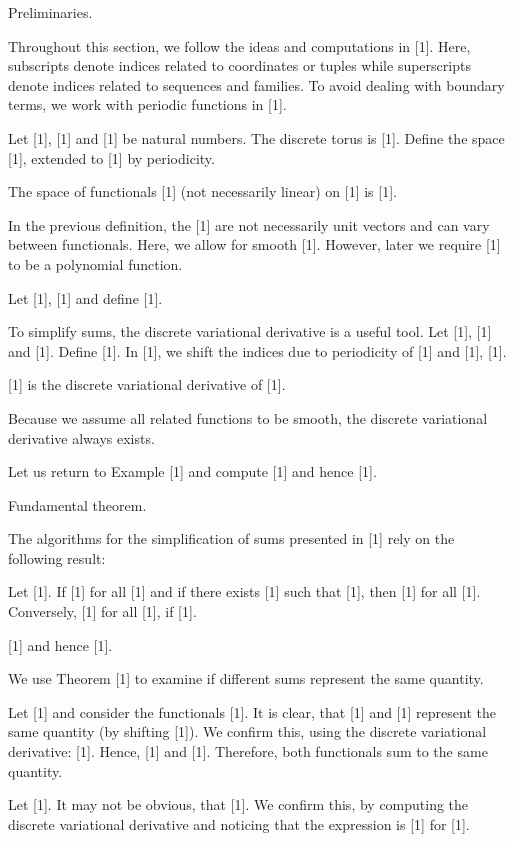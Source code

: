\documentclass{article}
\begin{document}
Preliminaries.



Throughout this section, we follow the ideas and computations in [1].
Here, subscripts denote indices related to coordinates or tuples while superscripts denote indices related to sequences and families.
To avoid dealing with boundary terms, we work with periodic functions in [1].

	Let [1], [1] and [1] be natural numbers. The {discrete torus} is [1]. Define the space
	[1],
	extended to [1] by periodicity.


	The space of functionals [1] (not necessarily linear) on [1] is
[1].

In the previous definition, the [1] are not necessarily unit vectors and can vary between functionals. Here, we allow for smooth [1]. However, later we require [1] to be a polynomial function.

	
	Let [1], [1] and define
	[1].

To simplify sums, the discrete variational derivative is a useful tool.
Let [1], [1] and [1]. Define
	[1].
	In [1], we shift the indices due to periodicity of [1] and [1],
	[1].

[1] is the discrete variational derivative of [1].

Because we assume all related functions to be smooth, the discrete variational derivative always exists.

	Let us return to Example [1] and compute
	[1]
	and hence [1].


Fundamental theorem.


The algorithms for the simplification of sums presented in [1] rely on the following result:

	Let [1]. If [1] for all [1] and if there exists [1] such that [1], then
	[1]
	for all [1].
	Conversely,
	[1]
	for all [1], if [1].


	[1]
	and hence [1].

We use Theorem [1] to examine if different sums represent the same quantity.

	Let [1] and consider the functionals
	[1].
	It is clear, that [1] and [1] represent the same quantity (by shifting [1]). We confirm this, using the discrete variational derivative:
	[1].
	Hence, [1] and [1]. Therefore, both functionals sum to the same quantity.



	Let [1]. It may not be obvious, that
	[1].
	We confirm this, by computing the discrete variational derivative and noticing that the expression is [1] for [1].
\end{document}
